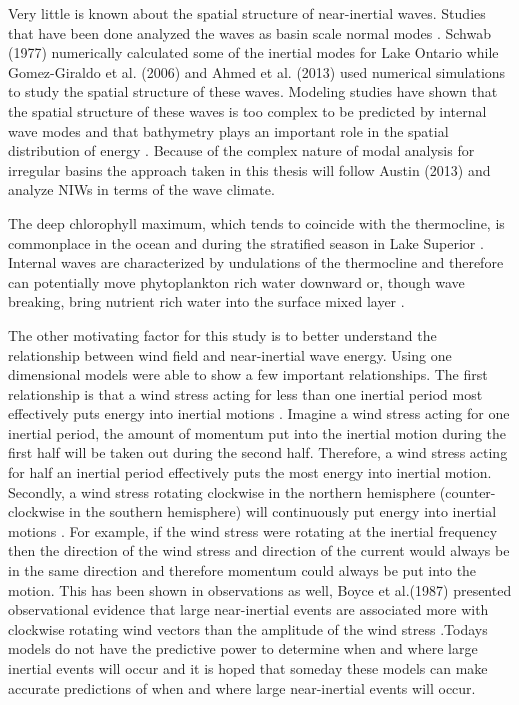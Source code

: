 Very little is known about the spatial structure of near-inertial waves. Studies that have been done analyzed the waves
as basin scale normal modes \citep{schwab_1977, rueda_2003, gomez_2006, ahmed2013spatial}. Schwab (1977) numerically calculated
some of the inertial modes for Lake Ontario while Gomez-Giraldo et al. (2006) and Ahmed et al. (2013) used numerical simulations to 
study the spatial structure of these waves. Modeling studies have shown that the spatial structure of these waves is too complex to be predicted
by internal wave modes and that bathymetry plays an important role in the spatial distribution of energy \citep{rueda_2003}. Because of the complex nature 
of modal analysis for irregular basins the approach taken in this thesis will follow Austin (2013) and analyze NIWs in terms of the wave climate. 

The deep chlorophyll maximum, which tends to coincide with the thermocline, is commonplace in the ocean \citep{cullen1982deep} and 
during the stratified season in Lake Superior \citep{barbiero_2004}. Internal waves are characterized by undulations of the thermocline and 
therefore can potentially move phytoplankton rich water downward or, though wave breaking, bring nutrient rich water into the surface 
mixed layer \citep{haury1979tidally} \citep{haury1983tidally}. 

The other motivating factor for this study is to better understand the relationship between wind field and near-inertial wave energy. 
Using one dimensional models \citet{pollard_1969,pollard_1970} were able to show a few important relationships. The first relationship
is that a wind stress acting for less than one inertial period most effectively puts energy into inertial motions \citep{pollard_1969}. Imagine a wind
stress acting for one inertial period, the amount of momentum put into the inertial motion during the first half will be taken out during the second half. Therefore, 
a wind stress acting for half an inertial period effectively puts the most energy into inertial motion. Secondly, a wind stress rotating
clockwise in the northern hemisphere (counter-clockwise in the southern hemisphere) will continuously put energy into inertial motions \citep{pollard_1970}.
For example, if the wind stress were rotating at the inertial frequency then the direction of the wind stress and direction of the current would always be in 
the same direction and therefore momentum could always be put into the motion. This has been shown in observations as well,  
Boyce et al.(1987) presented observational evidence that large near-inertial events are associated more with clockwise rotating
 wind vectors than the amplitude of the wind stress \citep{boyce_etal_1987}.Todays models do not have the predictive power to determine when and 
 where large inertial events will occur and it is hoped that someday these models can make accurate predictions of when and where large near-inertial events will occur. 

